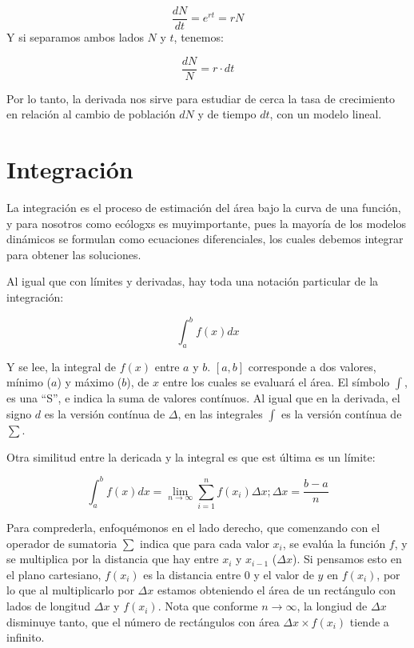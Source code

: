\documentclass[
]{book}
\begin{document}
\[\frac{dN}{dt} = e^{rt} = rN\]
Y si separamos ambos lados \(N\) y \(t\), tenemos:

\[\frac{dN}{N} = r \cdot dt\]

Por lo tanto, la derivada nos sirve para estudiar de cerca la tasa de crecimiento en relación al cambio de población \(dN\) y de tiempo \(dt\), con un modelo lineal.

\hypertarget{integraciuxf3n}{%
\section{Integración}\label{integraciuxf3n}}

La integración es el proceso de estimación del área bajo la curva de una función, y para nosotros como ecólogxs es muyimportante, pues la mayoría de los modelos dinámicos se formulan como ecuaciones diferenciales, los cuales debemos integrar para obtener las soluciones.

Al igual que con límites y derivadas, hay toda una notación particular de la integración:

\begin{equation}
    \int_a^b \!f(x) dx
\end{equation}

Y se lee, la integral de \(f(x)\) entre \(a\) y \(b\). \([a, b]\) corresponde a dos valores, mínimo (\(a\)) y máximo (\(b\)), de \(x\) entre los cuales se evaluará el área. El símbolo \(\int\), es una ``S'', e indica la suma de valores contínuos. Al igual que en la derivada, el signo \(d\) es la versión contínua de \(\Delta\), en las integrales \(\int\) es la versión contínua de \(\sum\).

Otra similitud entre la dericada y la integral es que est última es un límite:

\begin{equation}
    \int_a^b \!f(x) dx = \lim \limits_{n \rightarrow \infty} \sum_{i = 1}^n f(x_i) \Delta x; \Delta x = \frac{b-a}{n} \label{eq:integ-limite}
\end{equation}

Para comprederla, enfoquémonos en el lado derecho, que comenzando con el operador de sumatoria \(\sum\) indica que para cada valor \(x_i\), se evalúa la función \(f\), y se multiplica por la distancia que hay entre \(x_i\) y \(x_{i-1}\) (\(\Delta x\)). Si pensamos esto en el plano cartesiano, \(f(x_i)\) es la distancia entre \(0\) y el valor de \(y\) en \(f(x_i)\), por lo que al multiplicarlo por \(\Delta x\) estamos obteniendo el área de un rectángulo con lados de longitud \(\Delta x\) y \(f(x_i)\). Nota que conforme \(n \rightarrow \infty\), la longiud de \(\Delta x\) disminuye tanto, que el número de rectángulos con área \(\Delta x \times f(x_i)\) tiende a infinito.
\end{document}
